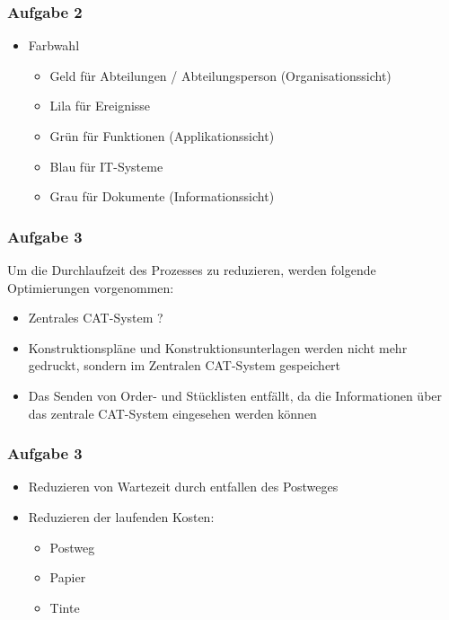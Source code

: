 \documentclass{beamer}
\begin{document}
\begin{frame}
\frametitle{Aufgabe 2}

\begin{itemize}
\item Farbwahl
	\begin{itemize}
	\setlength\itemsep{1.6em}
	\item Geld f\"ur Abteilungen / Abteilungsperson (Organisationssicht)
	\item Lila f\"ur Ereignisse
	\item Gr\"un f\"ur Funktionen (Applikationssicht)
	\item Blau f\"ur IT-Systeme
	\item Grau f\"ur Dokumente (Informationssicht)
	\end{itemize}
\end{itemize}

\end{frame}

\begin{frame}
\frametitle{Aufgabe 3}

Um die Durchlaufzeit des Prozesses zu reduzieren, werden folgende Optimierungen vorgenommen:\\
\begin{itemize}
\setlength\itemsep{2em}
\item Zentrales CAT-System ?
\item Konstruktionspl\"ane und Konstruktionsunterlagen werden nicht mehr gedruckt, sondern im Zentralen CAT-System gespeichert
\item Das Senden von Order- und Stücklisten entf\"allt, da die Informationen \"uber das zentrale CAT-System eingesehen werden k\"onnen
\end{itemize}

\end{frame}

\begin{frame}
\frametitle{Aufgabe 3}

\begin{itemize}
\setlength\itemsep{2em}
\item Reduzieren von Wartezeit durch entfallen des Postweges
\item Reduzieren der laufenden Kosten:
	\begin{itemize}
	\setlength\itemsep{1em}	
	\item Postweg
	\item Papier
	\item Tinte
	\end{itemize}
\end{itemize}

\end{frame}
\end{document}
